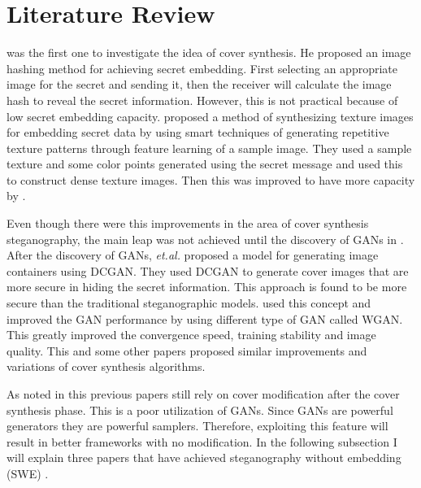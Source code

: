 \documentclass[../main/main.tex]{subfiles}
\begin{document}
	
	\section{Literature Review} \label{Literature}
	  was the first one to investigate the idea of cover synthesis.  He proposed an image hashing method for achieving secret embedding. First selecting an appropriate image for the secret and sending it, then the receiver will calculate the image hash to reveal the secret information. However, this is not practical because of low secret embedding capacity.  proposed a method of synthesizing texture images for embedding secret data by using smart techniques of generating repetitive texture patterns through feature learning of a sample image. They used a sample texture and some color points generated using the secret message and used this to construct dense texture images. Then this was improved to have more capacity by . 
	 
	 Even though there were this improvements in the area of cover synthesis steganography, the main leap was not achieved until the discovery of \gls{GAN}s in . After the discovery of \gls{GAN}s, \textit{et.al.}  proposed a model for generating image containers using \gls{DCGAN}. They used \gls{DCGAN} to generate cover images that are more secure in hiding the secret information. This approach is found to be more secure than the traditional steganographic models.  used this concept and improved the \gls{GAN} performance by using different type of \gls{GAN} called \gls{WGAN}. This greatly improved the convergence speed, training stability and image quality. This and some other papers proposed similar improvements and variations of cover synthesis algorithms.
	 
	 As noted in  this previous papers still rely on cover modification after the cover synthesis phase. This is a poor utilization of \gls{GAN}s. Since \gls{GAN}s are powerful generators they are powerful samplers. Therefore, exploiting this feature will result in better frameworks with no modification. In the following subsection I will explain three papers that have achieved steganography without embedding (\gls{SWE}) .
	 
\end{document}
